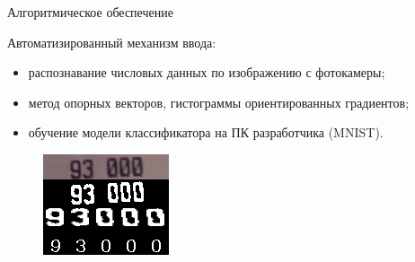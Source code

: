 \documentclass[hyperref={pdftex,unicode}]{beamer}
\begin{document}
\begin{frame}{Алгоритмическое обеспечение}
  \begin{minipage}{0.65\linewidth}
  Автоматизированный механизм ввода:
  \begin{itemize}
    \item распознавание числовых данных по изображению с фотокамеры;
    \item метод опорных векторов, гистограммы ориентированных градиентов;
    \item обучение модели классификатора на ПК разработчика (MNIST).
  \end{itemize}
  \end{minipage}
  \hfill
  \begin{minipage}{0.3\linewidth}
    \begin{figure}[h!]
      \centering
      \includegraphics[width=\textwidth]{fig/implementation_cv_recognition.png}
    \end{figure}
  \end{minipage}
\end{frame}
\end{document}
